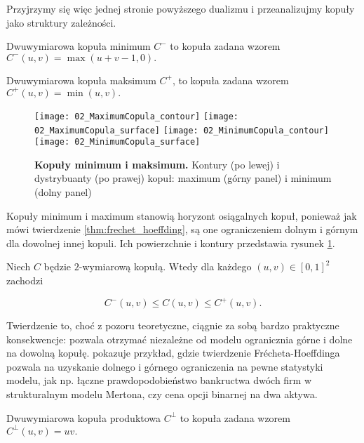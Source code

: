 Przyjrzymy się więc jednej stronie powyższego dualizmu i przeanalizujmy kopuły jako struktury zależności.

\begin{df}
	Dwuwymiarowa kopuła minimum $C^{-}$ to kopuła zadana wzorem $C^{-}(u, v) = \max(u+v-1, 0).$
\end{df}
\begin{df}
	Dwuwymiarowa kopuła maksimum $C^{+}$, to kopuła zadana wzorem $C^{+}(u, v) = \min(u, v).$
\end{df}

\begin{figure}[h]
	\centering
	\texttt{[image: 02\_MaximumCopula\_contour]}
	\texttt{[image: 02\_MaximumCopula\_surface]}
	\texttt{[image: 02\_MinimumCopula\_contour]}
	\texttt{[image: 02\_MinimumCopula\_surface]}
	
	\caption{\textbf{Kopuły minimum i maksimum.} Kontury (po lewej) i dystrybuanty (po prawej) kopuł: maximum (górny panel) i minimum (dolny panel)\label{fig:minmax_copula}}
\end{figure}

Kopuły minimum i maximum stanowią horyzont osiągalnych kopuł, ponieważ jak mówi twierdzenie \ref{thm:frechet_hoeffding}, są one ograniczeniem dolnym i górnym dla dowolnej innej kopuli. Ich powierzchnie i kontury przedstawia rysunek \ref{fig:minmax_copula}. 

\begin{thm}
	Niech $C$ będzie $2$-wymiarową kopułą. Wtedy dla każdego $(u, v)\in[0, 1]^2$ zachodzi
	
	$$ C^{-}(u, v) \leqslant C(u, v) \leqslant C^{+}(u, v).$$
	
	\label{thm:frechet_hoeffding}
\end{thm}

Twierdzenie to, choć z pozoru teoretyczne, ciągnie za sobą bardzo praktyczne konsekwencje: pozwala otrzymać niezależne od modelu ogranicznia górne i dolne na dowolną kopułę. \cite{Cherubini_Copula_Methods_in_Finance} pokazuje przykład, gdzie twierdzenie Frécheta-Hoeffdinga pozwala na uzyskanie dolnego i górnego ograniczenia na pewne statystyki modelu, jak np. łączne prawdopodobieństwo bankructwa dwóch firm w strukturalnym modelu Mertona, czy cena opcji binarnej na dwa aktywa.\\

\begin{df}
	Dwuwymiarowa kopuła produktowa $C^{\perp}$ to kopuła zadana wzorem $C^{\perp}(u, v) = uv.$
\end{df}

